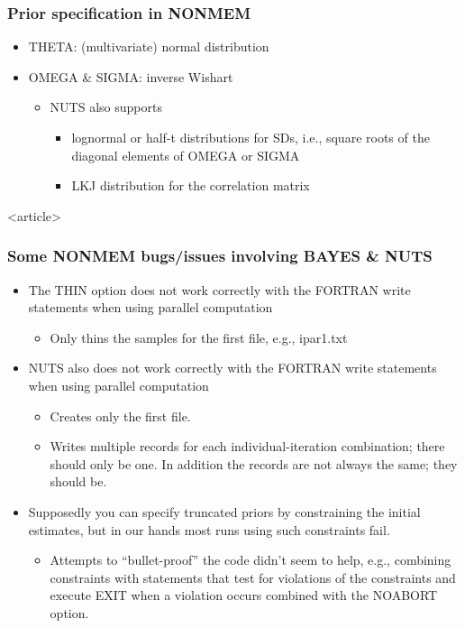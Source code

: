 \documentclass{beamer}
\begin{document}
\begin{frame}
  \frametitle{Prior specification in NONMEM}
  
  \begin{itemize}
  \item THETA: (multivariate) normal distribution
  \item OMEGA \& SIGMA: inverse Wishart
    \begin{itemize}
    \item NUTS also supports
      \begin{itemize}
      \item lognormal or half-t distributions for SDs, i.e., square
        roots of the diagonal elements of OMEGA or SIGMA
      \item LKJ distribution for the correlation matrix
      \end{itemize}
    \end{itemize}
    \end{itemize}

  \end{frame}

  \begin{frame}<article>
    \frametitle{Some NONMEM bugs/issues involving BAYES \& NUTS}

    \begin{itemize}
    \item The THIN option does not work correctly with the FORTRAN
      write statements when using parallel computation
      \begin{itemize}
      \item Only thins the samples for the first file, e.g., ipar1.txt
      \end{itemize}
    \item NUTS also does not work correctly with the FORTRAN write
      statements when using parallel computation
      \begin{itemize}
      \item Creates only the first file.
      \item Writes multiple records for each individual-iteration
        combination; there should only be one. In addition the records
        are not always the same; they should be.
      \end{itemize}
    \item Supposedly you can specify truncated priors by constraining
      the initial estimates, but in our hands most runs using such
      constraints fail.
      \begin{itemize}
        \item Attempts to ``bullet-proof'' the code didn't seem to help,
        e.g., combining constraints with statements that test for
        violations of the constraints and execute EXIT when a
        violation occurs combined with the NOABORT option.
      \end{itemize}
    \end{itemize}
    
  \end{frame}
\end{document}
